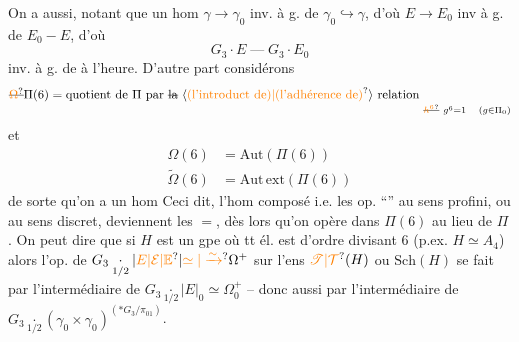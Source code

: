 On a aussi, notant que
un hom $\gamma\longrightarrow\gamma_0$ inv. à g. de $\gamma_0\hookrightarrow\gamma$, d'où $E\longrightarrow E_0$ inv à g. de $E_0\mathbin{-}E$, d'où
\[
G_3\cdot E\mathbin{\text{---}}G_3\cdot E_0
\]
inv. à g. de  à l'heure. D'autre part considérons
\[
\deleted{\unsure{\Omega}}\Pi(6)=\text{quotient de }\Pi\text{ par \deleted{la} \inserted{\unsure{(l'introduct de)|(l'adhérence de)}} relation }
\underset{\deleted{\unsure{h^6}}\ g^6=1\quad(g\in\Pi_0)}{\vphantom{\Pi}\strut}
\]
et 
\[
\begin{aligned}
\Omega(6)&=\mathrm{Aut}(\Pi(6))\\
\widetilde{\Omega}(6)&=\mathrm{Aut}\,\mathrm{ext}(\Pi(6))
\end{aligned}
\]
de sorte qu'on a un hom 
Ceci dit, l'hom composé
i.e. les op. ``'' au sens profini, ou au sens discret, deviennent les $=$, dès lors qu'on opère dans $\Pi(6)$ au lieu de $\Pi$. On peut dire que si $H$ est un gpe où tt él. est d'ordre divisant $6$ (p.ex. $H\simeq A_4$) alors l'op. de $G_3\underset{1/2}{\cdot}|\unsure{E|\mathcal E|\mathbb E}|\unsure{\simeq|\xrightarrow{\sim}}\Omega^+$ sur l'ens $\unsure{\mathscr T|\mathcal T}(H)$ ou $\mathrm{Sch}(H)$ se fait par l'intermédiaire de $G_3\underset{1/2}{\cdot}|E|_0\simeq\Omega_0^+$ -- donc aussi par l'intermédiaire de $G_3\underset{1/2}{\cdot}(\gamma_0\times\gamma_0)^{(*G_3/\pi_{01})}$.
